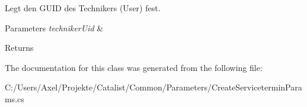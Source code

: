 Legt den G\+U\+ID des Technikers (User) fest. 


\begin{DoxyParams}{Parameters}
{\em techniker\+Uid} & \\
\hline
\end{DoxyParams}
\begin{DoxyReturn}{Returns}

\end{DoxyReturn}


The documentation for this class was generated from the following file\+:\begin{DoxyCompactItemize}
\item 
C\+:/\+Users/\+Axel/\+Projekte/\+Catalist/\+Common/\+Parameters/Create\+Servicetermin\+Params.\+cs\end{DoxyCompactItemize}
